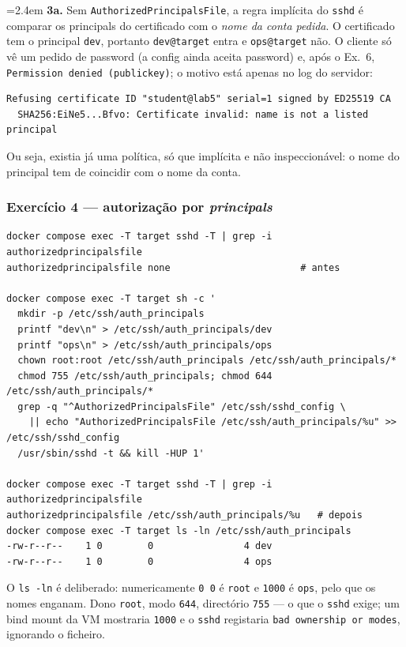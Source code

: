 \documentclass[a4paper,11pt]{article}
\newenvironment{answer}[1]{%
  \par\addvspace{7pt}\noindent
  \hangindent=2.4em\hangafter=1
  {\color{sscnblue}\bfseries #1\hspace{0.55em}}\ignorespaces}
  {\par\addvspace{5pt}}
\newcommand{\cmd}[1]{\textcolor{sscnblue}{\texttt{#1}}}
\begin{document}
\begin{answer}{3a.}
Sem \cmd{AuthorizedPrincipalsFile}, a regra impl\'icita do \cmd{sshd} \'e comparar os
principals do certificado com o \emph{nome da conta pedida}. O certificado tem o principal
\cmd{dev}, portanto \cmd{dev@target} entra e \cmd{ops@target} n\~ao. O cliente s\'o v\^e
um pedido de password (a config ainda aceita password) e, ap\'os o Ex.\ 6,
\cmd{Permission denied (publickey)}; o motivo est\'a apenas no log do servidor:

\begin{lstlisting}
Refusing certificate ID "student@lab5" serial=1 signed by ED25519 CA
  SHA256:EiNe5...Bfvo: Certificate invalid: name is not a listed principal
\end{lstlisting}

Ou seja, existia j\'a uma pol\'itica, s\'o que impl\'icita e n\~ao inspeccion\'avel: o nome
do principal tem de coincidir com o nome da conta.
\end{answer}

\subsubsection{Exerc\'icio 4 --- autoriza\c{c}\~ao por \emph{principals}}

\begin{lstlisting}
docker compose exec -T target sshd -T | grep -i authorizedprincipalsfile
authorizedprincipalsfile none                       # antes

docker compose exec -T target sh -c '
  mkdir -p /etc/ssh/auth_principals
  printf "dev\n" > /etc/ssh/auth_principals/dev
  printf "ops\n" > /etc/ssh/auth_principals/ops
  chown root:root /etc/ssh/auth_principals /etc/ssh/auth_principals/*
  chmod 755 /etc/ssh/auth_principals; chmod 644 /etc/ssh/auth_principals/*
  grep -q "^AuthorizedPrincipalsFile" /etc/ssh/sshd_config \
    || echo "AuthorizedPrincipalsFile /etc/ssh/auth_principals/%u" >> /etc/ssh/sshd_config
  /usr/sbin/sshd -t && kill -HUP 1'

docker compose exec -T target sshd -T | grep -i authorizedprincipalsfile
authorizedprincipalsfile /etc/ssh/auth_principals/%u   # depois
docker compose exec -T target ls -ln /etc/ssh/auth_principals
-rw-r--r--    1 0        0                4 dev
-rw-r--r--    1 0        0                4 ops
\end{lstlisting}

O \cmd{ls -ln} \'e deliberado: numericamente \cmd{0 0} \'e \cmd{root} e \cmd{1000} \'e
\cmd{ops}, pelo que os nomes enganam. Dono \cmd{root}, modo \cmd{644}, direct\'orio
\cmd{755} --- o que o \cmd{sshd} exige; um bind mount da VM mostraria \cmd{1000} e o
\cmd{sshd} registaria \cmd{bad ownership or modes}, ignorando o ficheiro.
\end{document}
